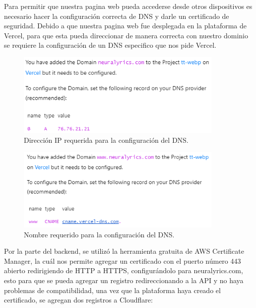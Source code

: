 \documentclass[12pt, a4paper, titlepage]{article}
\begin{document}
	Para permitir que nuestra pagina web pueda accederse desde otros dispositivos es necesario hacer la configuración correcta de DNS y darle un certificado de seguridad. Debido a que nuestra pagina web fue desplegada en la plataforma de Vercel, para que esta pueda direccionar de manera correcta con nuestro dominio se requiere la configuración de un DNS especifico que nos pide Vercel.
	\begin{figure}[H] 
		\includegraphics[width=10cm]{./Imagenes/DnsSSL/Dns1.png}
		\centering \caption{Dirección IP requerida para la configuración del DNS.}
	\end{figure}
	\begin{figure}[H] 
		\includegraphics[width=10cm]{./Imagenes/DnsSSL/Dns2.png}
		\centering \caption{Nombre requerido para la configuración del DNS.}
	\end{figure}
	Por la parte del backend, se utilizó la herramienta gratuita de AWS Certificate Manager, la cuál nos permite agregar un certificado con el puerto número 443 abierto redirigiendo de HTTP a HTTPS, 	configurándolo para neuralyrics.com, esto para que se pueda agregar un registro redireccionando a la API y no haya problemas de compatibilidad, una vez que la plataforma haya creado el certificado, se agregan dos registros a Cloudflare:
	
\end{document}
